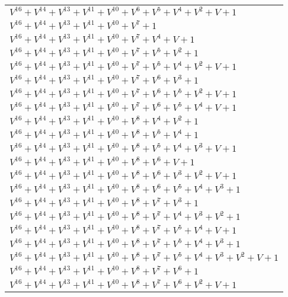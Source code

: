 \documentclass[12pt]{article}
\begin{document}
\begin{adjustwidth}{-4cm}{}
\begin{center}
\begin{longtable}{|l|}
$V^{16}  +V^{14}  +V^{13}  +V^{11}  +V^{10}  +V^{6}  +V^{5}  +V^{4}  +V^{2}  + V + 1$ \\
$V^{16}  +V^{14}  +V^{13}  +V^{11}  +V^{10}  +V^{7}  + 1$ \\
$V^{16}  +V^{14}  +V^{13}  +V^{11}  +V^{10}  +V^{7}  +V^{4}  + V + 1$ \\
$V^{16}  +V^{14}  +V^{13}  +V^{11}  +V^{10}  +V^{7}  +V^{5}  +V^{2}  + 1$ \\
$V^{16}  +V^{14}  +V^{13}  +V^{11}  +V^{10}  +V^{7}  +V^{5}  +V^{4}  +V^{2}  + V + 1$ \\
$V^{16}  +V^{14}  +V^{13}  +V^{11}  +V^{10}  +V^{7}  +V^{6}  +V^{3}  + 1$ \\
$V^{16}  +V^{14}  +V^{13}  +V^{11}  +V^{10}  +V^{7}  +V^{6}  +V^{5}  +V^{2}  + V + 1$ \\
$V^{16}  +V^{14}  +V^{13}  +V^{11}  +V^{10}  +V^{7}  +V^{6}  +V^{5}  +V^{4}  + V + 1$ \\
$V^{16}  +V^{14}  +V^{13}  +V^{11}  +V^{10}  +V^{8}  +V^{4}  +V^{2}  + 1$ \\
$V^{16}  +V^{14}  +V^{13}  +V^{11}  +V^{10}  +V^{8}  +V^{5}  +V^{4}  + 1$ \\
$V^{16}  +V^{14}  +V^{13}  +V^{11}  +V^{10}  +V^{8}  +V^{5}  +V^{4}  +V^{3}  + V + 1$ \\
$V^{16}  +V^{14}  +V^{13}  +V^{11}  +V^{10}  +V^{8}  +V^{6}  + V + 1$ \\
$V^{16}  +V^{14}  +V^{13}  +V^{11}  +V^{10}  +V^{8}  +V^{6}  +V^{3}  +V^{2}  + V + 1$ \\
$V^{16}  +V^{14}  +V^{13}  +V^{11}  +V^{10}  +V^{8}  +V^{6}  +V^{5}  +V^{4}  +V^{3}  + 1$ \\
$V^{16}  +V^{14}  +V^{13}  +V^{11}  +V^{10}  +V^{8}  +V^{7}  +V^{3}  + 1$ \\
$V^{16}  +V^{14}  +V^{13}  +V^{11}  +V^{10}  +V^{8}  +V^{7}  +V^{4}  +V^{3}  +V^{2}  + 1$ \\
$V^{16}  +V^{14}  +V^{13}  +V^{11}  +V^{10}  +V^{8}  +V^{7}  +V^{5}  +V^{4}  + V + 1$ \\
$V^{16}  +V^{14}  +V^{13}  +V^{11}  +V^{10}  +V^{8}  +V^{7}  +V^{5}  +V^{4}  +V^{3}  + 1$ \\
$V^{16}  +V^{14}  +V^{13}  +V^{11}  +V^{10}  +V^{8}  +V^{7}  +V^{5}  +V^{4}  +V^{3}  +V^{2}  + V + 1$ \\
$V^{16}  +V^{14}  +V^{13}  +V^{11}  +V^{10}  +V^{8}  +V^{7}  +V^{6}  + 1$ \\
$V^{16}  +V^{14}  +V^{13}  +V^{11}  +V^{10}  +V^{8}  +V^{7}  +V^{6}  +V^{2}  + V + 1$ \\

\end{longtable}
\end{center}
\end{adjustwidth}
\end{document}
